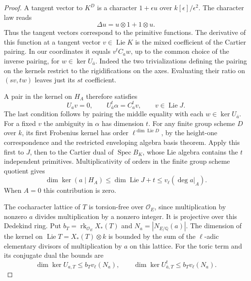 \begin{proof}
A tangent vector to \(K^D\) is a character \(1+\epsilon u\) over
\(k[\epsilon]/\epsilon^2\). The character law reads
\[
             \Delta u=u\otimes1+1\otimes u .
\]
Thus the tangent vectors correspond to the primitive functions. The derivative of this function at a tangent
vector \(v\in\operatorname{Lie}K\) is the mixed coefficient of the
Cartier pairing. In our coordinates it equals
\(v^t C_a w\), up to the common choice of the inverse pairing, for
\(w\in\ker U_{\bar a}\). Indeed the two trivializations defining
the pairing on the kernels restrict to the rigidifications on the
axes. Evaluating their ratio on \((sv,tw)\) leaves just its
\(st\) coefficient.

A pair in the kernel on \(H_A\) therefore satisfies
\[
 U_av=0,\qquad U_{\bar a}^{t}\alpha=C_a^t v,\qquad
 v\in\operatorname{Lie}J .
\]
The last condition follows by pairing the middle equality with
each \(w\in\ker U_{\bar a}\). For a fixed \(v\) the ambiguity
in \(\alpha\) has dimension \(t\). For any finite group scheme
\(D\) over \(k\), its first Frobenius kernel has order
\(\ell^{\dim\operatorname{Lie}D}\), by the height-one
correspondence and the restricted enveloping algebra basis theorem.
\cite[Theorem~1.4.23]{brion-height-one}
Apply this first to \(J\), then to the Cartier dual of
\(\operatorname{Spec}B_K\), whose Lie algebra contains the \(t\)
independent primitives. Multiplicativity of orders in the finite
group scheme quotient gives
\[
   \dim\ker(a\mid H_A)\le \dim\operatorname{Lie}J+t
                          \le v_\ell(\deg a|_A).
\]
When \(A=0\) this contribution is zero.

The cocharacter lattice of \(T\) is torsion-free over
\(\mathcal O_E\), since multiplication by nonzero \(a\) divides
multiplication by a nonzero integer. It is projective over this
Dedekind ring. Put \(b_T=\operatorname{rk}_{\mathcal O_E}X_*(T)\)
and \(N_a=|N_{E/\mathbb Q}(a)|\).
The dimension of the kernel on \(\operatorname{Lie}T=X_*(T)\otimes k\)
is bounded by the sum of the \(\ell\)-adic elementary divisors
of multiplication by \(a\) on this lattice. For the toric term
and its conjugate dual the bounds are
\[
    \dim\ker U_{a,T}\le b_Tv_\ell(N_a),\qquad
    \dim\ker U_{\bar a,T}^t\le b_Tv_\ell(N_a) .
\]


\end{proof}
